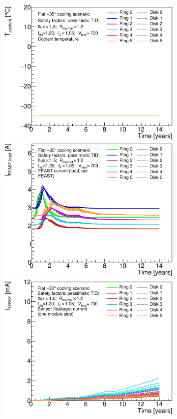 \begin{figure}[ht!]
\begin{subfigure}[t]{0.50\textwidth}
\begin{center}
\includegraphics[width=0.74\linewidth]{figures/studies/Endcap_CoolantTemperature_WorstCase.eps}
\includegraphics[width=0.74\linewidth]{figures/studies/Endcap_FeastCurrent_WorstCase.eps}
\includegraphics[width=0.74\linewidth]{figures/studies/Endcap_SensorCurrent_WorstCase.eps}

\end{center}
\end{subfigure}
\end{figure}
